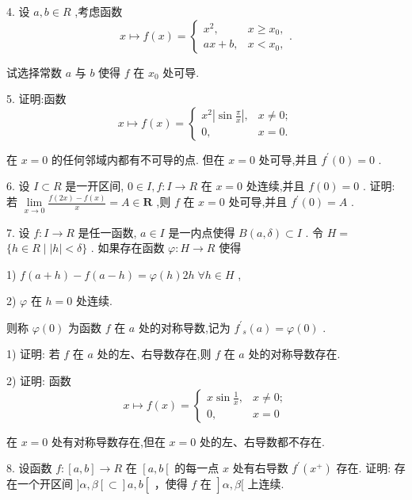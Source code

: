 4. 设 $a,b \in  R$ ,考虑函数
$$x \mapsto  f\left( x\right)  = \left\{  {\begin{array}{ll} {x}^{2}, & x \geq  {x}_{0}, \\  {ax} + b, & x < {x}_{0}, \end{array}.}\right.$$

试选择常数 $a$ 与 $b$ 使得 $f$ 在 ${x}_{0}$ 处可导.

5. 证明:函数
$$x \mapsto  f\left( x\right)  = \left\{  \begin{array}{ll} {x}^{2}\left| {\sin \frac{\pi }{x}}\right| , & x \neq  0; \\  0, & x = 0. \end{array}\right.$$

在 $x = 0$ 的任何邻域内都有不可导的点. 但在 $x = 0$ 处可导,并且 ${f}^{\prime }\left( 0\right)  = 0$ .

6. 设 $I \subset  R$ 是一开区间, $0 \in  I,f : I \rightarrow  R$ 在 $x = 0$ 处连续,并且 $f\left( 0\right)  = 0$ . 证明: 若 $\mathop{\lim }\limits_{{x \rightarrow  0}}\frac{f\left( {2x}\right)  - f\left( x\right) }{x} = A \in  \mathbf{R}$ ,则 $f$ 在 $x = 0$ 处可导,并且 ${f}^{\prime }\left( 0\right)  = A$ .

7. 设 $f : I \rightarrow  R$ 是任一函数, $a \in  I$ 是一内点使得 $B\left( {a,\delta }\right)  \subset  I$ . 令 $H =$  $\{ h \in  R \mid  \left| h\right|  < \delta \}$ . 如果存在函数 $\varphi  : H \rightarrow  R$ 使得

1) $f\left( {a + h}\right)  - f\left( {a - h}\right)  = \varphi \left( h\right) {2h}\;\forall h \in  H$ ,

2) $\varphi$ 在 $h = 0$ 处连续.

则称 $\varphi \left( 0\right)$ 为函数 $f$ 在 $a$ 处的对称导数,记为 ${f}^{\prime }{}_{s}\left( a\right)  = \varphi \left( 0\right)$ .

1) 证明: 若 $f$ 在 $a$ 处的左、右导数存在,则 $f$ 在 $a$ 处的对称导数存在.

2) 证明: 函数
$$x \mapsto  f\left( x\right)  = \left\{  \begin{array}{ll} x\sin \frac{1}{x}, & x \neq  0; \\  0, & x = 0 \end{array}\right.$$

在 $x = 0$ 处有对称导数存在,但在 $x = 0$ 处的左、右导数都不存在.

8. 设函数 $f : \left\lbrack  {a,b}\right\rbrack   \rightarrow  R$ 在 $\left\lbrack  {a,b\left\lbrack  \right. }\right.$ 的每一点 $x$ 处有右导数 ${f}^{\prime }\left( {x}^{ + }\right)$ 存在. 证明: 存在一个开区间 $\rbrack \alpha ,\beta \left\lbrack   \subset  \right\rbrack  a,b\left\lbrack  {\text{ ，使得 }f\text{ 在 }}\right\rbrack  \alpha ,\beta \lbrack$ 上连续.

